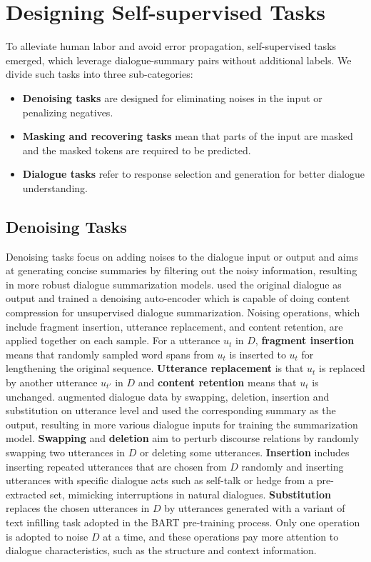 \section{Designing Self-supervised Tasks}
\label{sec:designselftasks}

To alleviate human labor and avoid error propagation, self-supervised 
tasks emerged, which leverage dialogue-summary pairs without additional 
labels.  We divide such tasks into three sub-categories:
\begin{itemize}
	\item \textbf{Denoising tasks} are designed for eliminating noises 
in the input or penalizing negatives.
	\item \textbf{Masking and recovering tasks} mean that parts of the input are masked and the masked tokens are required to be predicted.
	\item \textbf{Dialogue tasks} refer to response selection and generation for better dialogue understanding.
\end{itemize}


\subsection{Denoising Tasks}

Denoising tasks focus on adding
noises to the dialogue input or output and aims at generating concise summaries by filtering out the noisy information, resulting in more robust dialogue 
summarization models.
\citet{zou2021unsupervised} used the original dialogue as output and trained a denoising auto-encoder which is capable of doing content compression for unsupervised dialogue summarization.
Noising operations, which include fragment insertion, utterance replacement, and
content retention, are applied together on each sample.
For a utterance $u_t$ in $D$, \textbf{fragment insertion} means that randomly sampled 
word spans from $u_t$ is inserted to $u_t$ for lengthening the original 
sequence.
\textbf{Utterance replacement} is that $u_t$ is replaced by another utterance $u_{t'}$ in $D$ and \textbf{content retention} means that $u_t$ is unchanged. 
\citet{chen2021simple} augmented dialogue data by swapping, deletion, insertion 
and substitution on utterance level and used the corresponding summary as 
the output, resulting in more various dialogue inputs for training the summarization model. 
\textbf{Swapping} and \textbf{deletion} aim to perturb discourse relations by randomly swapping two utterances in $D$ or deleting some utterances.
\textbf{Insertion} includes inserting repeated utterances that are chosen from $D$ randomly and inserting utterances with specific dialogue acts such as self-talk or hedge from a pre-extracted set, mimicking interruptions in natural dialogues.
\textbf{Substitution} replaces the chosen utterances in $D$ by utterances generated with a variant of text infilling task adopted in the BART pre-training process.
Only one operation is adopted to noise $D$ at a time, and these operations pay more attention to dialogue characteristics, such as the structure and context information.



